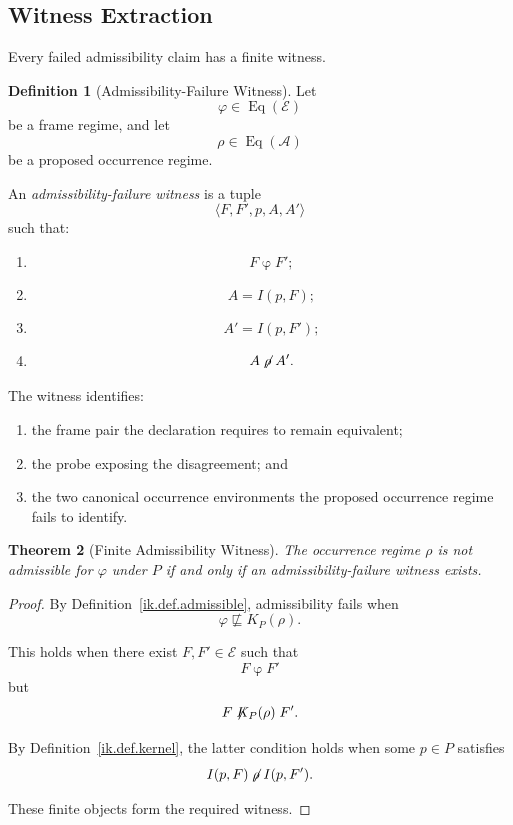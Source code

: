 \documentclass[11pt]{article}
\theoremstyle{plain}
\newtheorem{theorem}{Theorem}[section]
\theoremstyle{definition}
\newtheorem{definition}[theorem]{Definition}
\theoremstyle{remark}
\begin{document}
\subsection{Witness Extraction}

Every failed admissibility claim
has a finite witness.

\begin{definition}[Admissibility-Failure Witness]
  \label{ik.def.admissibility-witness}
  Let
  \[
    \varphi
    \in
    \operatorname{Eq}(\mathcal{E})
  \]
  be a frame regime,
  and let
  \[
    \rho
    \in
    \operatorname{Eq}(\mathcal{A})
  \]
  be a proposed occurrence regime.

  An \emph{admissibility-failure witness}
  is a tuple
  \[
    \langle
    F,
    F',
    p,
    A,
    A'
    \rangle
  \]
  such that:
  \begin{enumerate}[label=(\alph*)]
    \item
          \[
            F\mathrel{\varphi}F';
          \]
    \item
          \[
            A
            =
            I(p,F);
          \]
    \item
          \[
            A'
            =
            I(p,F');
          \]
    \item
          \[
            A
            \not\mathrel{\rho}
            A'.
          \]
  \end{enumerate}
\end{definition}

The witness identifies:

\begin{enumerate}[label=(\alph*)]
  \item the frame pair
        the declaration requires to remain equivalent;
  \item the probe exposing the disagreement; and
  \item the two canonical occurrence environments
        the proposed occurrence regime fails to identify.
\end{enumerate}

\begin{theorem}[Finite Admissibility Witness]
  \label{ik.thm.finite-admissibility-witness}
  The occurrence regime \(\rho\)
  is not admissible for \(\varphi\) under \(P\)
  if and only if
  an admissibility-failure witness exists.
\end{theorem}

\begin{proof}
  By Definition~\ref{ik.def.admissible},
  admissibility fails when
  \[
    \varphi
    \not\sqsubseteq
    K_P(\rho).
  \]

  This holds when
  there exist \(F,F'\in\mathcal{E}\)
  such that
  \[
    F\mathrel{\varphi}F'
  \]
  but
  \[
    F
    \not\mathrel{K_P(\rho)}
    F'.
  \]

  By Definition~\ref{ik.def.kernel},
  the latter condition holds when
  some \(p\in P\) satisfies
  \[
    I(p,F)
    \not\mathrel{\rho}
    I(p,F').
  \]

  These finite objects form
  the required witness.
\end{proof}
\end{document}
